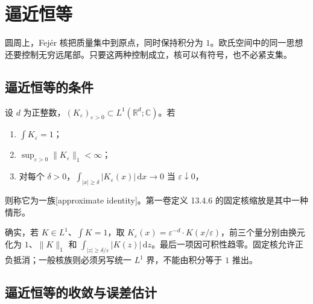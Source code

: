 \section{逼近恒等}
\label{b2:sec:0304}

圆周上，Fejér 核把质量集中到原点，同时保持积分为 \(1\)。欧氏空间中的同一思想还要控制无穷远尾部。只要这两种控制成立，核可以有符号，也不必紧支集。

\subsection{逼近恒等的条件}
\label{b2:subsec:030401}

\begin{definition}\label{b2:def:03-approximate-identity}
设 \(d\) 为正整数，\((K_\varepsilon)_{\varepsilon>0}\subset L^1(\mathbb R^d;\mathbb C)\)。若
\begin{enumerate}
\item\label{b2:item:03-identity-mass}\(\int K_\varepsilon=1\)；
\item\label{b2:item:03-identity-bound}\(\sup_{\varepsilon>0}\|K_\varepsilon\|_1<\infty\)；
\item\label{b2:item:03-identity-tail}对每个 \(\delta>0\)，\(\int_{|x|\geq\delta}|K_\varepsilon(x)|\,\mathrm{d}x\to0\) 当 \(\varepsilon\downarrow0\)，
\end{enumerate}
则称它为一族[approximate identity]。第一卷定义 13.4.6 的固定核缩放是其中一种情形。
\end{definition}

确实，若 \(K\in L^1\)、\(\int K=1\)，取 \(K_\varepsilon(x)=\varepsilon^{-d}\cdot K(x/\varepsilon)\)，前三个量分别由换元化为 \(1\)、\(\|K\|_1\) 和 \(\int_{|z|\geq\delta/\varepsilon}|K(z)|\,\mathrm{d}z\)。最后一项因可积性趋零。固定核允许正负抵消；一般核族则必须另写统一 \(L^1\) 界，不能由积分等于 \(1\) 推出。

\subsection{逼近恒等的收敛与误差估计}
\label{b2:subsec:030402}


